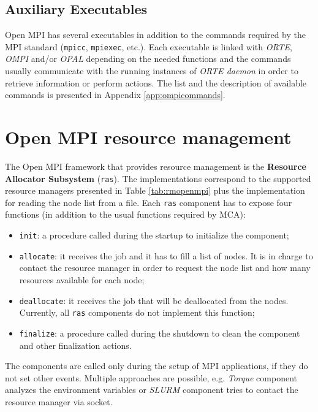 \subsection{Auxiliary Executables}
Open MPI has several executables in addition to the commands required by the
MPI standard (\texttt{mpicc}, \texttt{mpiexec}, etc.). Each executable is
linked with \emph{ORTE}, \emph{OMPI} and/or \emph{OPAL} depending on the needed
functions and the commands usually communicate with the running instances of
\emph{ORTE daemon} in order to retrieve information or perform actions.
The list and the description of available commands is presented in Appendix
\ref{app:ompicommands}.

\section{Open MPI resource management}
\label{sec:ompi-rm}
The Open MPI framework that provides resource management is the \textbf{Resource
Allocator Subsystem} (\texttt{ras}). The implementations correspond to the 
supported resource managers presented in Table \ref{tab:rmopenmpi} plus the
implementation for reading the node list from a file.
Each \texttt{ras} component has to expose four functions (in addition to the
usual functions required by MCA):
\begin{itemize}
\item \texttt{init}: a procedure called during the startup to initialize the
                     component;
\item \texttt{allocate}: it receives the job and it has to fill a list of nodes.
                         It is in charge to contact the resource manager in
                         order to request the node list and how many resources
						 available for each node;
\item \texttt{deallocate}: it receives the job that will be deallocated from the
                           nodes. Currently, all \texttt{ras} components do not
                           implement this function;

\item \texttt{finalize}: a procedure called during the shutdown to clean the
                         component and other finalization actions.

\end{itemize}

The components are called only during the setup of MPI applications, if they
do not set other events. Multiple approaches are possible, e.g. \emph{Torque}
component analyzes the environment variables or \emph{SLURM} component
tries to contact the resource manager via socket.

